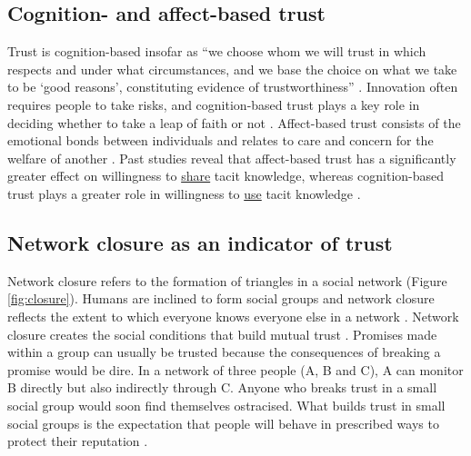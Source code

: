 \subsection{Cognition- and affect\hyp{}based trust}

Trust is cognition-based insofar as \enquote{we choose whom we will trust in which respects and under what circumstances, and we base the choice on what we take to be \enquote{good reasons}, constituting evidence of trustworthiness} \citep[][pg. 970]{lewis1985trust}. Innovation often requires people to take risks, and cognition\hyp{}based trust plays a key role in deciding whether to take a leap of faith or not \citep{mcevily2011measuring}. Affect-based trust consists of the emotional bonds between individuals and relates to care and concern for the welfare of another \citep{mcallister1995affect}. Past studies reveal that affect\hyp{}based trust has a significantly greater effect on willingness to \underline{share} tacit knowledge, whereas cognition-based trust plays a greater role in willingness to \underline{use} tacit knowledge \citep{levin2004strength,holste2010trust,ding2015research}. 

\subsection{Network closure as an indicator of trust}

Network closure refers to the formation of triangles in a social network (Figure \ref{fig:closure}). Humans are inclined to form social groups and network closure reflects the extent to which everyone knows everyone else in a network \citep{coleman1990foundations}. Network closure creates the social conditions that build mutual trust \citep{ahuja2000collaboration, fulmer2013trust}. Promises made within a group can usually be trusted because the consequences of breaking a promise would be dire. In a network of three people (A, B and C), A can monitor B directly but also indirectly through C. Anyone who breaks trust in a small social group would soon find themselves ostracised. What builds trust in small social groups is the expectation that people will behave in prescribed ways to protect their reputation \citep{coleman1990foundations, burt2005brokerage}.

